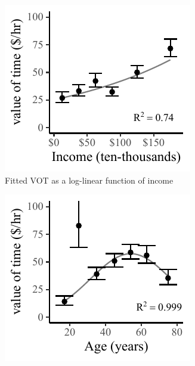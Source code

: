 \documentclass[numbered]{trbunofficial}\usepackage[]{graphicx}\usepackage[]{color}
\makeatletter
\def\maxwidth{ %
  \ifdim\Gin@nat@width>\linewidth
    \linewidth
  \else
    \Gin@nat@width
  \fi
}
\newenvironment{knitrout}{}{} %
\makeatother
\begin{document}
\begin{figure}[H]
  \centering
  \begin{subfigure}[b]{0.32\textwidth}
\begin{knitrout}
\color{fgcolor}
\includegraphics[width=\maxwidth]{figure/plot_incfit-1} 

\end{knitrout}
	  \caption{\centering Fitted VOT as a log-linear function of income}
	  \label{fig:incfit}
	\end{subfigure}
	\begin{subfigure}[b]{0.32\textwidth}
\begin{knitrout}
\color{fgcolor}
\includegraphics[width=\maxwidth]{figure/plot_agefit-1} 


\end{knitrout}
\end{subfigure}
\end{figure}
\end{document}
